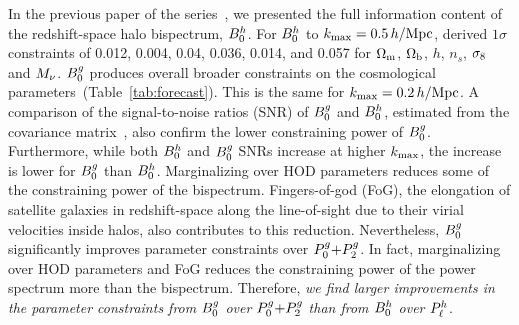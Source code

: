 

In the previous paper of the series~\citep{hahn2020}, we presented the full
information content of the redshift-space halo bispectrum, $B^h_0$. For $B^h_0$ to
$k_{\rm max}=0.5\,h/\mathrm{Mpc}$, \cite{hahn2020} derived $1\sigma$ constraints of 
0.012, 0.004, 0.04, 0.036, 0.014, and 0.057 
for $\Omega_{\rm m}$, $\Omega_{\rm b}$, $h$, $n_s$, $\sigma_8$ and $M_\nu$. 
$B^g_0$ produces overall broader constraints on the cosmological parameters~(Table~\ref{tab:forecast}). This
is the same for $k_{\rm max}=0.2\,h/\mathrm{Mpc}$. A comparison of the signal-to-noise ratios
(SNR) of $B^g_0$ and $B^h_0$, estimated from the covariance
matrix~\citep[\eg][]{sefusatti2005,sefusatti2006,chan2017}, also confirm the lower
constraining power of $B^g_0$. Furthermore, while both $B^h_0$ and $B^g_0$ SNRs increase 
at higher $k_{\rm max}$, the increase is lower for $B^g_0$ than $B^h_0$.
Marginalizing over HOD parameters reduces some of the constraining power of 
the bispectrum. Fingers-of-god (FoG), the elongation of satellite galaxies
in redshift-space along the line-of-sight due to their virial velocities inside 
halos, also contributes to this reduction. 
Nevertheless, $B^g_0$ significantly improves parameter constraints over $P^g_0{+}P^g_2$.
In fact, marginalizing over HOD parameters and FoG reduces the constraining
power of the power spectrum more than the bispectrum. Therefore, {\em we find 
larger improvements in the parameter constraints from $B^g_0$ over $P^g_0{+}P^g_2$ than
from $B^h_0$ over $P^h_{\ell}$}.

